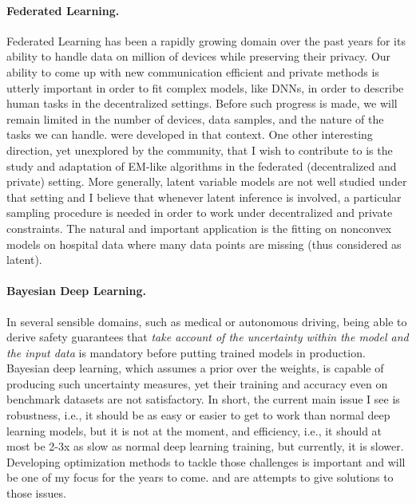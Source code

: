 \documentclass[twoside,11pt]{article}
\begin{document}
\paragraph{Federated Learning.} 
Federated Learning has been a rapidly growing domain over the past years for its ability to handle data on million of devices while preserving their privacy.
Our ability to come up with new communication efficient and private methods is utterly important in order to fit complex models, like DNNs, in order to describe human tasks in the decentralized settings.
Before such progress is made, we will remain limited in the number of devices, data samples, and the nature of the tasks we can handle.
\citep{had2020, karimi2020lars} were developed in that context.
One other interesting direction, yet unexplored by the community, that I wish to contribute to is the study and adaptation of EM-like algorithms in the federated (decentralized and private) setting.
More generally, latent variable models are not well studied under that setting and I believe that whenever latent inference is involved, a particular sampling procedure is needed in order to work under decentralized and private constraints.
The natural and important application is the fitting on nonconvex models on hospital data where many data points are missing (thus considered as latent).


\vspace{0.08in}
\paragraph{Bayesian Deep Learning.} 
In several sensible domains, such as medical or autonomous driving, being able to derive safety guarantees that \emph{take account of the uncertainty within the model and the input data} is mandatory before putting trained models in production.
Bayesian deep learning, which assumes a prior over the weights, is capable of producing such uncertainty measures, yet their training and accuracy even on benchmark datasets are not satisfactory.
In short, the current main issue I see is robustness, i.e., it should be as easy or easier to get to work than normal deep learning models, but it is not at the moment, and efficiency, i.e., it should at most be 2-3x as slow as normal deep learning training, but currently, it is slower.
Developing optimization methods to tackle those challenges is important and will be one of my focus for the years to come.
\citep{karimi2020hwa} and \citep{karimi2020misso} are attempts to give solutions to those issues.
\end{document}
